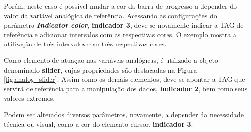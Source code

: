 Porém, neste caso é possível mudar a cor da barra de progresso 
a depender do valor da variável analógica de referência. 
Acessando as configurações do parâmetro 
\textbf{\textit{Indicator color}},
\textbf{indicador 3}, 
deve-se novamente indicar a TAG de referência e 
adicionar intervalos com as respectivas cores. 
O exemplo mostra a utilização de três intervalos com três respectivas cores.



Como elemento de atuação nas variáveis analógicas, 
é utilizado a objeto denominado \textbf{slider}, 
cujas propriedades são destacadas na 
Figura \ref{fig:analog_slider}. 
Assim como os demais elementos, 
deve-se apontar a TAG que servirá de referência para 
a manipulação dos dados,
\textbf{indicador 2}, 
bem como seus valores extremos.

Podem ser alterados diversos parâmetros, 
novamente, a depender da necessidade técnica ou visual, 
como a cor do elemento cursor, 
\textbf{indicador 3}. 




\begin{figure}[ht!]
	\centering
\end{figure}





